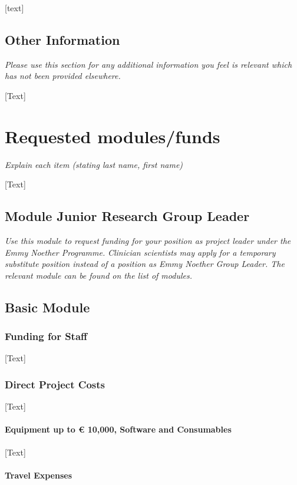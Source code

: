 \documentclass[11pt]{article} %
\begin{document}
[text]

\subsection{  Other Information }
\textit{Please use this section for any additional information you feel is relevant which has not been provided elsewhere.}

[Text]

\section{Requested modules/funds}
\textit{Explain each item (stating last name, first name)}

[Text]


\subsection{Module Junior Research Group Leader}
\textit{Use this module to request funding for your position as project leader under the Emmy Noether Programme.}
\textit{Clinician scientists may apply for a temporary substitute position instead of a position as Emmy Noether Group Leader. The relevant module can be found on the list of modules.}
\subsection{Basic Module}

\subsubsection{ Funding for Staff }

[Text]

\subsubsection{  Direct Project Costs }

[Text]

\paragraph{Equipment up to € 10,000, Software and Consumables}

[Text]

\paragraph{Travel Expenses}
\end{document}
